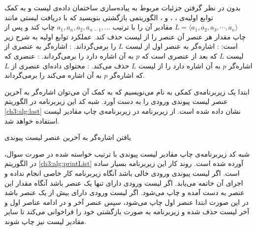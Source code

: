 



 بدون در نظر گرفتن جزئیات مربوط به پیاده‌سازی ساختمان داده‌ی لیست و به کمک توابع اولیه‌ی {}،  {}، {} و {}، الگوریتمی بازگشتی بنویسید که با دریافت لیستی مانند {$L=\langle a_1,a_2,a_3,\cdots,a_n\rangle$} مقادیر آن را با ترتیب {$a_1,a_n,a_2,a_{n-1},\ldots$} چاپ کند و پس از چاپ مقدار هر عنصر آن عنصر را از لیست حذف کند. عملکرد توابع اولیه به شرح زیر است:
: اشاره‌گر به عنصر اول از لیست {$L$} را برمی‌گرداند.
: اشاره‌گر به عنصری از لیست {$L$} که بعد از عنصری است که {$p$} به آن اشاره دارد را برمی‌گرداند.
: عنصری که اشاره‌گر {$p$} به آن اشاره دارد را از لیست {$L$} حذف می‌کند.
: محتوای داده‌ای عنصری از {$L$} که اشاره‌گر {$p$} به آن اشاره می‌کند را برمی‌گرداند.


ابتدا یک زیربرنامه‌ی کمکی به نام {} می‌نویسیم که به کمک آن می‌توان اشاره‌گر به آخرین عنصر لیست پیوندی ورودی را به دست آورد. شبه کد این زیربرنامه در الگوریتم {\ref{ch3:alg:last}} نشان داده شده است. از زیربرنامه {} در زیربرنامه‌ی چاپ مقادیر لیست استفاده خواهد شد.
\begin{algorithm}
\caption{یافتن اشاره‌گر به آخرین عنصر لیست پیوندی}\label{ch3:alg:last}
\begin{latin}
\end{latin}
\end{algorithm}

شبه کد زیربرنامه‌ی چاپ مقادیر لیست پیوندی با ترتیب خواسته شده در صورت سوال، در الگوریتم {\ref{ch3:alg:printList}} آورده شده است. روند کار این زیربرنامه بسیار ساده است. اگر لیست پیوندی ورودی خالی باشد آنگاه زیربرنامه کار خاصی انجام نداده و اجرای آن خاتمه می‌یابد. اگر لیست ورودی دارای تنها یک عنصر باشد آنگاه مقدار این عنصر به دست آمده و چاپ می‌شود. اگر لیست ورودی دارای بیش از یک عنصر باشد در این صورت ابتدا عنصر اول چاپ می‌شود، سپس عنصر آخر و در ادامه عناصر اول و آخر لیست حذف شده و زیربرنامه به صورت بازگشتی خود را فراخوانی می‌کند تا سایر مقادیر لیست نیز چاپ شوند.

